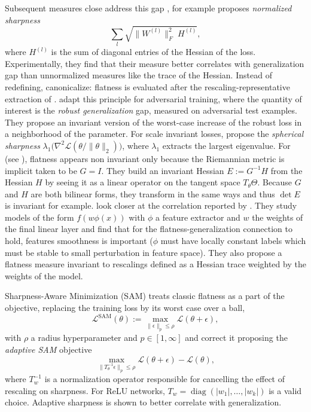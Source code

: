\documentclass[mathematics,review,submit,moreauthors]{Definitions/mdpi}
\begin{document}
Subsequent measures close address this gap \citep{tsuzuku2019,yi2019,petzka2021anips}, for example \citet{tsuzuku2019} proposes \emph{normalized sharpness}
\begin{equation*}
    \sum_{l}\sqrt{\lVert W^{(l)}\rVert_F^2\;H^{(l)}},
\end{equation*}
where $H^{(l)}$ is the sum of diagonal entries of the Hessian of the loss.
Experimentally, they find that their measure better correlates with generalization gap than unnormalized measures like the trace of the Hessian.
Instead of redefining, \citet{pittorino2022jsm} canonicalize: flatness is evaluated after the rescaling-representative extraction of .
\citet{stutz2021} adapt this principle for adversarial training, where the quantity of interest is the \emph{robust generalization} gap, measured on adversarial test examples.
They propose an invariant version of the worst-case increase of the robust loss in a neighborhood of the parameter.
For scale invariant losses, \citet{lyu2023} propose the \emph{spherical sharpness} $\lambda_1\big(\nabla^2\mathcal{L}(\theta/\lVert\theta\rVert_2)\big)$, where $\lambda_1$ extracts the largest eigenvalue.
For \citet{kristiadi2023anips} (see ), flatness appears non invariant only because the Riemannian metric is implicit taken to be $G=I$.
They build an invariant Hessian $E:=G^{-1}H$ from the Hessian $H$ by seeing it as a linear operator on the tangent space $T_\theta\Theta$. Because $G$ and $H$ are both bilinear forms, they transform in the same ways and thus $\det E$ is invariant for example.
\citet{petzka2021anips} look closer at the correlation reported by \citet{keskar2017}.
They study models of the form $f(w\phi(x))$ with $\phi$ a feature extractor and $w$ the weights of the final linear layer and find that for the flatness-generalization connection to hold, features smoothness is important ($\phi$ must have locally constant labels which must be stable to small perturbation in feature space).
They also propose a flatness measure invariant to rescalings defined as a Hessian trace weighted by the weights of the model.

Sharpness-Aware Minimization (SAM) \citep{foret2021} treats classic flatness as a part of the objective, replacing the training loss by its worst case over a ball,
\begin{equation*}
    \mathcal{L}^{\mathrm{SAM}}(\theta):=\max_{\lVert\epsilon\rVert_p\le\rho}\mathcal{L}(\theta+\epsilon),
\end{equation*}
with $\rho$ a radius hyperparameter and $p\in[1,\infty]$ and \citet{kwon2021p3icml} correct it proposing the \emph{adaptive SAM} objective
\begin{equation*}
    \max_{\lVert T_\theta^{-1}\epsilon\rVert_p\le\rho}\mathcal{L}(\theta+\epsilon)-\mathcal{L}(\theta),
\end{equation*}
where $T_w^{-1}$ is a normalization operator responsible for cancelling the effect of rescaling on sharpness. For ReLU networks, $T_w=\operatorname{diag}(|w_1|, \dots, |w_k|)$ is a valid choice. Adaptive sharpness is shown to better correlate with generalization.
\end{document}
